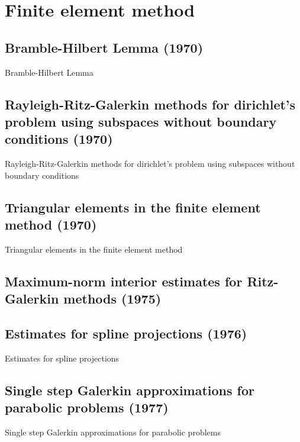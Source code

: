 \chapter{Finite element method}

\section{Bramble-Hilbert Lemma (1970)}
Bramble-Hilbert Lemma\cite{bramble1970estimation}



\section{Rayleigh-Ritz-Galerkin methods for dirichlet's problem using subspaces without boundary conditions (1970)}
Rayleigh-Ritz-Galerkin methods for dirichlet's problem using subspaces without boundary conditions\cite{bramble1970rayleigh}



\section{Triangular elements in the finite element method (1970)}
Triangular elements in the finite element method\cite{bramble1970triangular}



\section{Maximum-norm interior estimates for Ritz-Galerkin methods (1975)}
\cite{bramble1975maximum}



\section{Estimates for spline projections (1976)}
Estimates for spline projections\cite{bramble1976estimates}




\section{Single step Galerkin approximations for parabolic problems (1977)}
Single step Galerkin approximations for parabolic problems\cite{baker1977single}



